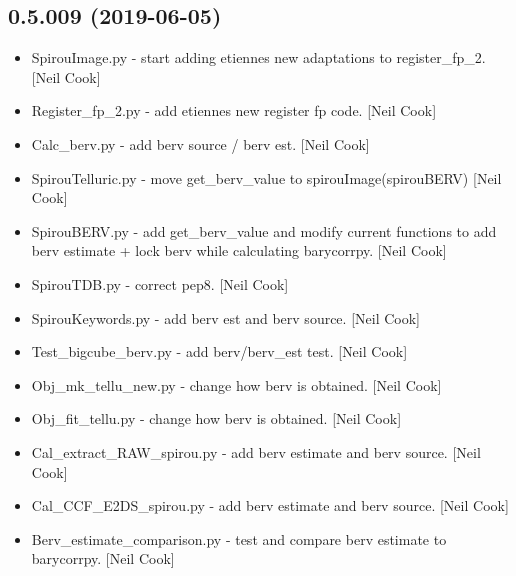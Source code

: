 \documentclass[a4paper,10pt,english]{report}
\begin{document}
\subsection{0.5.009 (2019-06-05)}
\label{\detokenize{misc/changelog:id126}}\begin{itemize}
\item {} 
SpirouImage.py - start adding etiennes new adaptations to
register\_fp\_2. {[}Neil Cook{]}

\item {} 
Register\_fp\_2.py - add etiennes new register fp code. {[}Neil Cook{]}

\item {} 
Calc\_berv.py - add berv source / berv est. {[}Neil Cook{]}

\item {} 
SpirouTelluric.py - move get\_berv\_value to spirouImage(spirouBERV)
{[}Neil Cook{]}

\item {} 
SpirouBERV.py - add get\_berv\_value and modify current functions to add
berv estimate + lock berv while calculating barycorrpy. {[}Neil Cook{]}

\item {} 
SpirouTDB.py - correct pep8. {[}Neil Cook{]}

\item {} 
SpirouKeywords.py - add berv est and berv source. {[}Neil Cook{]}

\item {} 
Test\_bigcube\_berv.py - add berv/berv\_est test. {[}Neil Cook{]}

\item {} 
Obj\_mk\_tellu\_new.py - change how berv is obtained. {[}Neil Cook{]}

\item {} 
Obj\_fit\_tellu.py - change how berv is obtained. {[}Neil Cook{]}

\item {} 
Cal\_extract\_RAW\_spirou.py - add berv estimate and berv source. {[}Neil
Cook{]}

\item {} 
Cal\_CCF\_E2DS\_spirou.py - add berv estimate and berv source. {[}Neil
Cook{]}

\item {} 
Berv\_estimate\_comparison.py - test and compare berv estimate to
barycorrpy. {[}Neil Cook{]}

\end{itemize}
\end{document}
